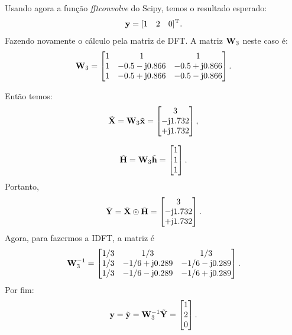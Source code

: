 \documentclass{homeworkclass}
\begin{document}
\begin{homeworkProblem}
\begin{equation*}
	\end{equation*}
	Usando agora a função \textit{fftconvolve} do Scipy, temos o resultado esperado:
	\begin{equation*}
	\mathbf{y} = [1 \quad 2 \quad 0]^{\mathrm{T}}. 
	\end{equation*}
	Fazendo novamente o cálculo pela matriz de DFT. A matriz $\mathbf{W}_{3}$ neste caso é:
	\begin{equation*} \mathbf{W}_{3} = 
	\begin{bmatrix} 
	1  & 1 & 1 \\ 
	1 & -0.5-\mathrm{j}0.866 & -0.5+\mathrm{j}0.866 \\
	1 & -0.5+\mathrm{j}0.866 & -0.5-\mathrm{j}0.866	
	\end{bmatrix}.
	\end{equation*}
	
	Então temos:
	\begin{equation*}
	\tilde{\mathbf{X}} = \mathbf{W}_{3}\tilde{\mathbf{x}} = 	\begin{bmatrix} 
	3 \\ 
	-\mathrm{j}1.732 \\
	+\mathrm{j}1.732
	\end{bmatrix},
	\end{equation*}

	\begin{equation*}
	\tilde{\mathbf{H}} = \mathbf{W}_{3}\tilde{\mathbf{h}} = 	\begin{bmatrix} 
	1 \\ 
	1 \\ 
	1 
	\end{bmatrix}.
	\end{equation*}
	Portanto,
	\begin{equation*}
	\tilde{\mathbf{Y}} = \tilde{\mathbf{X}} \odot \tilde{\mathbf{H}} = \begin{bmatrix} 
	3 \\ 
	-\mathrm{j}1.732 \\
	+\mathrm{j}1.732
	\end{bmatrix}.
	\end{equation*}
	Agora, para fazermos a IDFT, a matriz é
	\begin{equation*}  \mathbf{W}_{3}^{-1} = 
	\begin{bmatrix} 
	1/3  & 1/3 & 1/3 \\ 
	1/3 & -1/6 +\mathrm{j}0.289 & -1/6-\mathrm{j}0.289 \\
	1/3 & -1/6 -\mathrm{j}0.289 & -1/6+\mathrm{j}0.289	
	\end{bmatrix}.
	\end{equation*}
	Por fim:
	\begin{equation*}
	\mathbf{y} = \tilde{\mathbf{y}} = \mathbf{W}_{3}^{-1} \tilde{\mathbf{Y}} = \begin{bmatrix} 
	1 \\ 
	2 \\
	0
	\end{bmatrix}.
	\end{equation*}	
	

\end{homeworkProblem}
\end{document}
